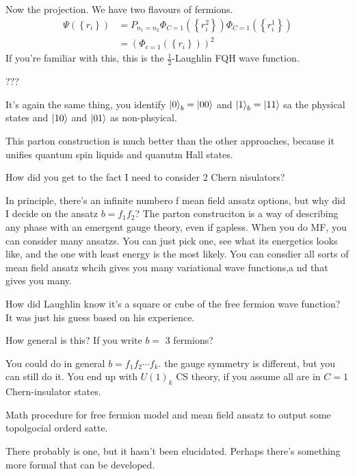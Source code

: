 Now the projection.
We have two flavours of fermions.
\begin{align}
    \Psi\left( \left\{ r_i \right\} \right)
    &=
    P_{n_1=n_2}
    \Phi_{C=1}\left( \left\{ r_i^2 \right\} \right)
    \Phi_{C=1}\left( \left\{ r_i^1 \right\} \right)\\
    &=
    \left( \Phi_{c=1}\left( \left\{ r_i \right\} \right) \right)^2
\end{align}
If you're familiar with this,
this is the $\frac{1}{2}$-Laughlin FQH wave function.

\begin{question}
    ???
\end{question}
It's again the same thing,
you identify
$\ket{0}_b=\ket{00}$ and $\ket{1}_b=\ket{11}$ sa the physical states
and $\ket{10}$ and $\ket{01}$ as non-phsyical.

This parton construction is much better than the other approaches,
because it unifies quantum spin liquids and quanutm Hall states.

\begin{question}
    How did you get to the fact I need to consider 2 Chern nisulators?
\end{question}
In principle,
there's an infinite numbero f mean field ansatz options,
but why did I decide on the ansatz $b=f_1f_2$?
The parton construciton is a way of describing any phase with an emergent gauge
theory,
even if gapless.
When you do MF,
you can consider many ansatzs.
You can just pick one,
see what its energetics looks like,
and the one with least energy is the most likely.
You can consdier all sorts of mean field ansatz whcih gives you many variational
wave functions,a
nd that gives you many.

How did Laughlin know it's a square or cube of the free fermion wave function?
It was just his guess based on his experience.

\begin{question}
    How general is this?
    If you write $b=$ 3 fermions?
\end{question}
You could do in general $b=f_1f_2\cdots f_k$.
the gauge symmetry is different,
but you can still do it.
You end up with $U(1)_k$ CS theory,
if you assume all are in $C=1$ Chern-insulator states.

\begin{question}
    Math procedure for free fermion model and mean field ansatz to output some
    topolgocial orderd satte.
\end{question}
There probably is one,
but it hasn't been elucidated.
Perhaps there's something more formal that can be developed.

